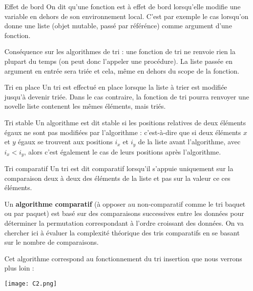 \begin{defi}{Effet de bord} On dit qu'une fonction est à effet de bord lorsqu'elle modifie une variable  en dehors de son environnement local. C'est par exemple le cas lorsqu'on donne une liste (objet mutable, passé par référénce) comme argument d'une fonction.

Conséquence sur les algorithmes de tri : une fonction de tri ne renvoie rien la plupart du temps (on peut donc l'appeler une procédure). La liste passée en argument en entrée sera triée et cela, même en dehors du scope de la fonction. 
\end{defi}


\begin{defi}{Tri en place} 
Un tri est effectué en place lorsque la liste à trier est modifiée jusqu'à devenir triée. Dans le cas contraire, la fonction de tri pourra renvoyer une novelle liste contenent les mêmes éléments, mais triés. 
\end{defi}


\begin{defi}{Tri stable} 
Un algorithme est dit stable si les positions relatives de deux éléments égaux ne sont pas
modifiées par l'algorithme : c'est-à-dire que si deux éléments $x$ et $y$ égaux se trouvent aux positions $i_x$ et $i_y$ de
la liste avant l'algorithme, avec $i_x < i_y$, alors c'est également le cas de leurs positions après l'algorithme.
\end{defi}

\begin{defi}{Tri comparatif}
Un tri est dit comparatif lorsqu'il s'appuie uniquement sur la comparaison deux à deux des éléments de la liste et pas sur la valeur ce ces éléments.
\end{defi}



\begin{exemple}%

Un \textbf{algorithme comparatif} (à opposer au non-comparatif comme le tri baquet ou par paquet) est basé sur des comparaisons successives entre les données pour déterminer la permutation correspondant à l'ordre croissant des données.
On va chercher ici à évaluer la complexité théorique des tris comparatifs en se basant sur le nombre de comparaisons.

Cet algorithme correspond au fonctionnement du tri insertion que nous verrons plus loin :

\begin{center}
\texttt{[image: C2.png]}
\end{center}

\end{exemple}

